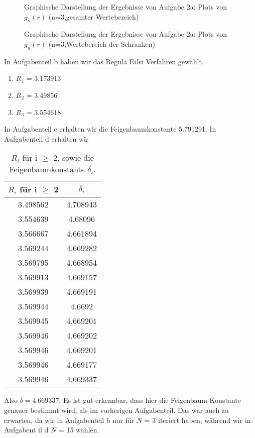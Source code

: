 \begin{landscape}
	\begin{figure}
		\OverfullCenter{\texttt{[image: ../A2/2a\_n=3.pdf]}}
		\caption{Graphische Darstellung der Ergebnisse von Aufgabe 2a: Plots von $g_n(r)$ (n=3,gesamter Wertebereich)}
		\label{fig:2a_3}
	\end{figure}
\end{landscape}

\begin{landscape}
	\begin{figure}
		\OverfullCenter{\texttt{[image: ../A2/2a\_n=3\_schranken.pdf]}}
		\caption{Graphische Darstellung der Ergebnisse von Aufgabe 2a: Plots von $g_n(r)$ (n=3,Wertebereich der Schranken)}
		\label{fig:2a_3_schranken}
	\end{figure}
\end{landscape}
In Aufgabenteil b haben wir das Regula Falsi Verfahren gewählt.
\begin{enumerate}
\item $R_1$ = 3.173913
\item $R_2$ = 3.49856
\item $R_3$ = 3.554618
\end{enumerate}
In Aufgabenteil c erhalten wir die Feigenbaumkonstante 5.791291. In Aufgabenteil d erhalten wir
\begin{table}[]
	\centering
	\caption{$R_i$ für i $\geq$ 2, sowie die Feigenbaumkonstante $\delta_i$. }
	\label{RDelta}
	\begin{tabular}{cc}
		\toprule
		$R_i$ für i $\geq$ 2 & $\delta_i$   \\
		\midrule
		3.498562                     & 4.708943 \\
		3.554639                     & 4.68096   \\
		3.566667                     & 4.661894  \\
		3.569244                     & 4.669282   \\
		3.569795                     & 4.668954   \\
		3.569913                     & 4.669157   \\
		3.569939                     & 4.669191   \\
		3.569944                     & 4.6692     \\
		3.569945                     & 4.669201   \\
		3.569946                     & 4.669202   \\
		3.569946                     & 4.669201   \\
		3.569946                     & 4.669177   \\
		3.569946                     & 4.669337  \\
		\bottomrule
	\end{tabular}
\end{table}
Also $\delta = 4.669337$.
Es ist gut erkennbar, dass hier die Feigenbaum-Konstante genauer bestimmt wird, als
im vorherigen Aufgabenteil. Das war auch zu erwarten, da wir in Aufgabenteil b nur für $N$ = 3 iteriert
haben, während wir in Aufgabent il d $N$ = 15 wählen.


